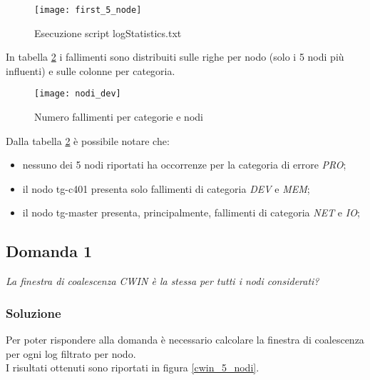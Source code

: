 \begin{figure}[!htbp]
  \centering
  \texttt{[image: first\_5\_node]}
  \caption{Esecuzione script logStatistics.txt}
  \label{first_5_node}
\end{figure}

In tabella \ref{nodi_dev} i fallimenti sono distribuiti sulle righe per nodo
(solo i 5 nodi più influenti) e sulle colonne per categoria.\\

\begin{figure}[!htbp]
  \centering
  \texttt{[image: nodi\_dev]}
  \caption{Numero fallimenti per categorie e nodi}
  \label{nodi_dev}
\end{figure}

Dalla tabella \ref{nodi_dev} è possibile notare che:
\begin{itemize}
  \item nessuno dei 5 nodi riportati ha occorrenze per la
  categoria di errore \textit{PRO};
  \item il nodo tg-c401 presenta solo fallimenti di categoria \textit{DEV} e
  \textit{MEM};
  \item il nodo tg-master presenta, principalmente, fallimenti di categoria
  \textit{NET} e \textit{IO};
\end{itemize}

\clearpage

\subsection{Domanda 1}
\textit{La finestra di coalescenza CWIN è la stessa per tutti i nodi considerati?}

\subsubsection*{Soluzione}
Per poter rispondere alla domanda è necessario calcolare la finestra di coalescenza
per ogni log filtrato per nodo.\\
I risultati ottenuti sono riportati in figura \ref{cwin_5_nodi}.\\

